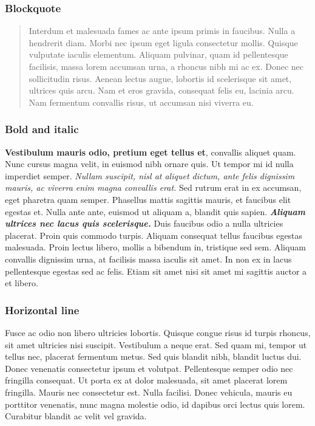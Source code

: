 \documentclass{article}
\begin{document}
\subsubsection{Blockquote}\label{H7176378}


\begin{quote}



Interdum et malesuada fames ac ante ipsum primis in faucibus. Nulla a hendrerit diam. Morbi nec ipsum eget ligula consectetur mollis. Quisque vulputate iaculis elementum. Aliquam pulvinar, quam id pellentesque facilisis, massa lorem accumsan urna, a rhoncus nibh mi ac ex. Donec nec sollicitudin risus. Aenean lectus augue, lobortis id scelerisque sit amet, ultrices quis arcu. Nam et eros gravida, consequat felis eu, lacinia arcu. Nam fermentum convallis risus, ut accumsan nisi viverra eu.


\end{quote}


\subsubsection{Bold and italic}\label{H6762577}



\textbf{Vestibulum mauris odio, pretium eget tellus et}, convallis aliquet quam. Nunc cursus magna velit, in euismod nibh ornare quis. Ut tempor mi id nulla imperdiet semper. \emph{Nullam suscipit, nisl at aliquet dictum, ante felis dignissim mauris, ac viverra enim magna convallis erat.} Sed rutrum erat in ex accumsan, eget pharetra quam semper. Phasellus mattis sagittis mauris, et faucibus elit egestas et. Nulla ante ante, euismod ut aliquam a, blandit quis sapien. \emph{\textbf{Aliquam ultrices nec lacus quis scelerisque.}} Duis faucibus odio a nulla ultricies placerat. Proin quis commodo turpis. Aliquam consequat tellus faucibus egestas malesuada. Proin lectus libero, mollis a bibendum in, tristique sed sem. Aliquam convallis dignissim urna, at facilisis massa iaculis sit amet. In non ex in lacus pellentesque egestas sed ac felis. Etiam sit amet nisi sit amet mi sagittis auctor a et libero.


\subsubsection{Horizontal line}\label{H8807675}



Fusce ac odio non libero ultricies lobortis. Quisque congue risus id turpis rhoncus, sit amet ultricies nisi suscipit. Vestibulum a neque erat. Sed quam mi, tempor ut tellus nec, placerat fermentum metus. Sed quis blandit nibh, blandit luctus dui. Donec venenatis consectetur ipsum et volutpat. Pellentesque semper odio nec fringilla consequat. Ut porta ex at dolor malesuada, sit amet placerat lorem fringilla. Mauris nec consectetur est. Nulla facilisi. Donec vehicula, mauris eu porttitor venenatis, nunc magna molestie odio, id dapibus orci lectus quis lorem. Curabitur blandit ac velit vel gravida.
\end{document}
